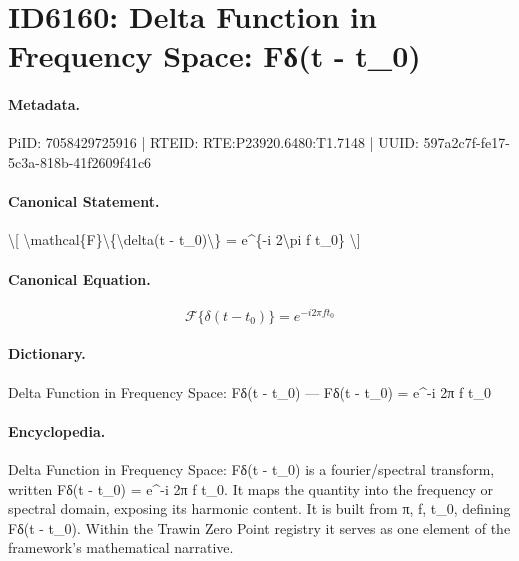 \section*{ID6160: Delta Function in Frequency Space: Fδ(t - t\_0)}
\paragraph{Metadata.}
PiID: 7058429725916 | RTEID: RTE:P23920.6480:T1.7148 | UUID: 597a2c7f-fe17-5c3a-818b-41f2609f41c6

\paragraph{Canonical Statement.}
\textbackslash{}[ \textbackslash{}mathcal\{F\}\textbackslash{}\{\textbackslash{}delta(t - t\_0)\textbackslash{}\} = e\textasciicircum{}\{-i 2\textbackslash{}pi f t\_0\} \textbackslash{}]

\paragraph{Canonical Equation.}
\[
\mathcal{F}\{\delta(t - t_0)\} = e^{-i 2\pi f t_0}
\]

\paragraph{Dictionary.}
Delta Function in Frequency Space: Fδ(t - t\_0) — Fδ(t - t\_0) = e\textasciicircum{}-i 2π f t\_0

\paragraph{Encyclopedia.}
Delta Function in Frequency Space: Fδ(t - t\_0) is a fourier/spectral transform, written Fδ(t - t\_0) = e\textasciicircum{}-i 2π f t\_0. It maps the quantity into the frequency or spectral domain, exposing its harmonic content. It is built from π, f, t\_0, defining Fδ(t - t\_0). Within the Trawin Zero Point registry it serves as one element of the framework's mathematical narrative.
